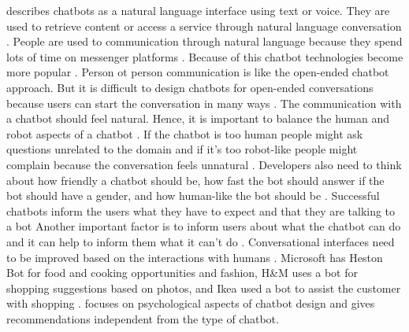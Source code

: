 \citet{brandtzaeg2018chatbots} describes chatbots as a natural language interface using text or voice.
They are used to retrieve content or access a service through natural language conversation \cite{brandtzaeg2018chatbots}.
People are used to communication through natural language because they spend lots of time on messenger platforms \cite{brandtzaeg2018chatbots}.
Because of this chatbot technologies become more popular \cite{brandtzaeg2018chatbots}.
Person ot person communication is like the open-ended chatbot approach.
But it is difficult to design chatbots for open-ended conversations because users can start the conversation
in many ways \cite{brandtzaeg2018chatbots}.
The communication with a chatbot should feel natural.
Hence, it is important to balance the human and robot aspects of a chatbot \cite{brandtzaeg2018chatbots}.
If the chatbot is too human people might ask questions unrelated to the domain and if it's too robot-like people might
complain because the conversation feels unnatural \cite{brandtzaeg2018chatbots}.
Developers also need to think about how friendly a chatbot should be, how fast the bot should answer if the bot should
have a gender, and how human-like the bot should be \cite{brandtzaeg2018chatbots}.
Successful chatbots inform the users what they have to expect and that they are talking to a bot \cite{brandtzaeg2018chatbots}
Another important factor is to inform users about what the chatbot can do and it can help to inform them what 
it can't do \cite{brandtzaeg2018chatbots}.
Conversational interfaces need to be improved based on the interactions with humans \cite{brandtzaeg2018chatbots}.
Microsoft has Heston Bot for food and cooking opportunities and fashion, H\&M uses a bot for shopping 
suggestions based on photos, and Ikea used a bot to assist the customer with shopping \cite{brandtzaeg2018chatbots}.
\citet{brandtzaeg2018chatbots} focuses on psychological aspects of chatbot design and gives recommendations
independent from the type of chatbot.

